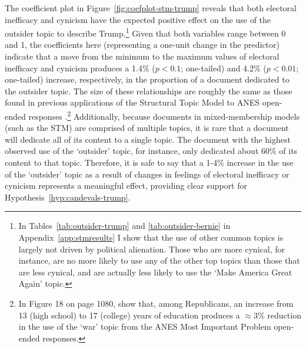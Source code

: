\documentclass[12pt]{article}
\begin{document}
The coefficient plot in Figure~\ref{fig:coefplot-stm-trump} reveals that both electoral inefficacy and cynicism have the expected positive effect on the use of the outsider topic to describe Trump.\footnote{In Tables~\ref{tab:outsider-trump} and \ref{tab:outsider-bernie} in Appendix~\ref{app:stmresults} I show that the use of other common topics is largely not driven by political alienation. Those who are more cynical, for instance, are no more likely to use any of the other top topics than those that are less cynical, and are actually less likely to use the `Make America Great Again' topic.} Given that both variables range between 0 and 1, the coefficients here (representing a one-unit change in the predictor) indicate that a move from the minimum to the maximum values of electoral inefficacy and cynicism produces a 1.4\% ($p<0.1$; one-tailed) and 4.2\% ($p<0.01$; one-tailed) increase, respectively, in the proportion of a document dedicated to the outsider topic. The size of these relationships are roughly the same as those found in previous applications of the Structural Topic Model to ANES open-ended responses \parencite[e.g.,][]{roberts2014structural}.\footnote{In Figure 18 on page 1080, \textcite{roberts2014structural} show that, among Republicans, an increase from 13 (high school) to 17 (college) years of education produces a $\approx$3\% reduction in the use of the `war' topic from the ANES Most Important Problem open-ended responses.} Additionally, because documents in mixed-membership models (such as the STM) are comprised of multiple topics, it is rare that a document will dedicate all of its content to a single topic. The document with the highest observed use of the `outsider' topic, for instance, only dedicated about 60\% of its content to that topic. Therefore, it is safe to say that a 1-4\% increase in the use of the `outsider' topic as a result of changes in feelings of electoral inefficacy or cynicism represents a meaningful effect, providing clear support for Hypothesis~\ref{hyp:candevals-trump}.  
\end{document}

